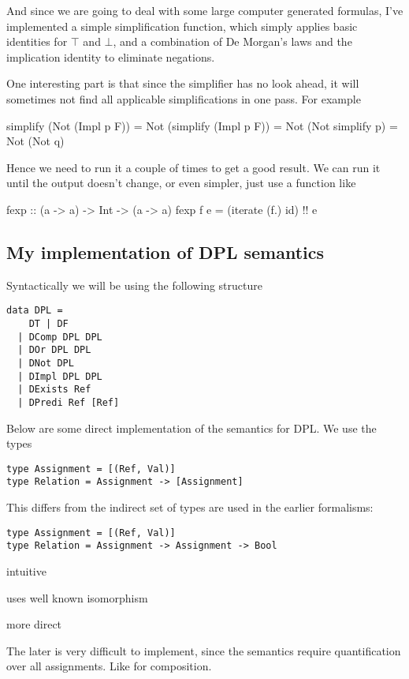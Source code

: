 \documentclass[12pt]{article}
\begin{document}
And since we are going to deal with some large computer generated formulas, I've implemented a simple simplification function, which simply applies basic identities for $\top$ and $\bot$, and a combination of De Morgan's laws and the implication identity to eliminate negations.

One interesting part is that since the simplifier has no look ahead, it will sometimes not find all applicable simplifications in one pass. For example
%
\begin{haskell}
simplify (Not (Impl p F)) = Not (simplify (Impl p F))
                          = Not (Not simplify p)
                          = Not (Not q)
\end{haskell}
%
Hence we need to run it a couple of times to get a good result. We can run it until the output doesn't change, or even simpler, just use a function like
%
\begin{haskell}
fexp :: (a -> a) -> Int -> (a -> a)
fexp f e = (iterate (f.) id) !! e
\end{haskell}

\subsection{My implementation of DPL semantics}

Syntactically we will be using the following structure

\begin{lstlisting}
data DPL =
    DT | DF
  | DComp DPL DPL
  | DOr DPL DPL
  | DNot DPL
  | DImpl DPL DPL
  | DExists Ref
  | DPredi Ref [Ref]
\end{lstlisting}

Below are some direct implementation of the semantics for DPL. We use the types
\begin{lstlisting}
type Assignment = [(Ref, Val)]
type Relation = Assignment -> [Assignment]
\end{lstlisting}
This differs from the indirect set of types are used in the earlier formalisms:
\begin{lstlisting}
type Assignment = [(Ref, Val)]
type Relation = Assignment -> Assignment -> Bool
\end{lstlisting}

intuitive

uses well known isomorphism

more direct

The later is very difficult to implement, since the semantics require quantification over all assignments. Like for composition.
\end{document}
